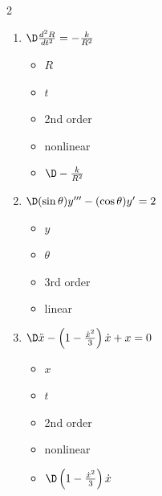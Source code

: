 \documentclass[12pt]{amsart}
\numberwithin{equation}{section}
\begin{document}
\begin{multicols}{2}
\begin{enumerate}[1.]
\vspace{1.1cm}

\item  $\D \frac{d^2R}{dt^2} = -\frac{k}{R^2}$
	\begin{itemize}
	\item $R$
	\item $t$
	\item 2nd order 
	\item nonlinear
	\item $\D -\frac{k}{R^2}$
	\end{itemize}

\vspace{1.1cm}

\item  $\D (\sin \theta)y''' - (\cos \theta)y' = 2$
	\begin{itemize}
	\item $y$
	\item $\theta$
	\item 3rd order
	\item linear
	\end{itemize}

\vspace{1.1cm}

\item  $\D \ddot{x} - \left( 1 - \frac{\dot{x}^2}{3} \right)\dot{x} + x = 0$
	\begin{itemize}
	\item $x$
	\item $t$
	\item 2nd order
	\item nonlinear
	\item $\D \left( 1 - \frac{\dot{x}^2}{3} \right)\dot{x}$
	\end{itemize}
\end{enumerate}
\end{multicols}
\end{document}

